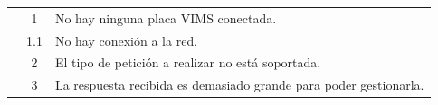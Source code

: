 \begin{table}[H]
\begin{tabularx}{\textwidth}{|c|c|X|}
    \cline{2-3}
                                                & 1                                                                                                                                         & \multicolumn{1}{L|}{No hay ninguna placa \ac{VIMS} conectada.}                                           \\
    \cline{2-3}
                                                & 1.1                                                                                                                                       & \multicolumn{1}{L|}{No hay conexión a la red.}                                                           \\
    \cline{2-3}
                                                & 2                                                                                                                                         & \multicolumn{1}{L|}{El tipo de petición a realizar no está soportada.}                                   \\
    \cline{2-3}
                                                & 3                                                                                                                                         & \multicolumn{1}{L|}{La respuesta recibida es demasiado grande para poder gestionarla.}                   \\
    \hline
  \end{tabularx}
\end{table}
